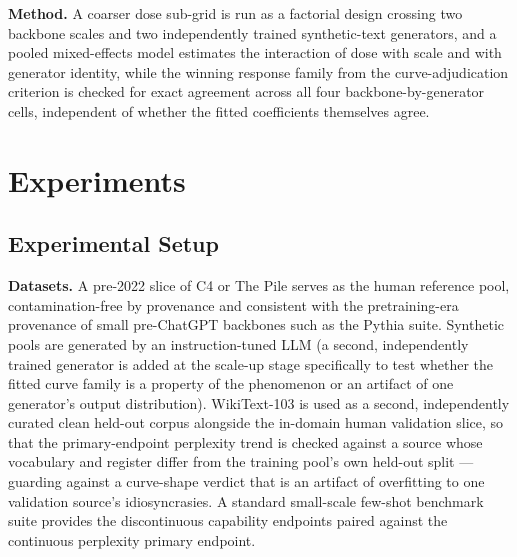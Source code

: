 \documentclass[11pt]{article}
\begin{document}
\textbf{Method.} A coarser dose sub-grid is run as a factorial design crossing two backbone scales and two independently trained synthetic-text generators, and a pooled mixed-effects model estimates the interaction of dose with scale and with generator identity, while the winning response family from the curve-adjudication criterion is checked for exact agreement across all four backbone-by-generator cells, independent of whether the fitted coefficients themselves agree.

\section{Experiments}

\subsection{Experimental Setup}

\textbf{Datasets.} A pre-2022 slice of C4 or The Pile serves as the human reference pool, contamination-free by provenance and consistent with the pretraining-era provenance of small pre-ChatGPT backbones such as the Pythia suite. Synthetic pools are generated by an instruction-tuned LLM (a second, independently trained generator is added at the scale-up stage specifically to test whether the fitted curve family is a property of the phenomenon or an artifact of one generator's output distribution). WikiText-103 is used as a second, independently curated clean held-out corpus alongside the in-domain human validation slice, so that the primary-endpoint perplexity trend is checked against a source whose vocabulary and register differ from the training pool's own held-out split --- guarding against a curve-shape verdict that is an artifact of overfitting to one validation source's idiosyncrasies. A standard small-scale few-shot benchmark suite provides the discontinuous capability endpoints paired against the continuous perplexity primary endpoint.
\end{document}
